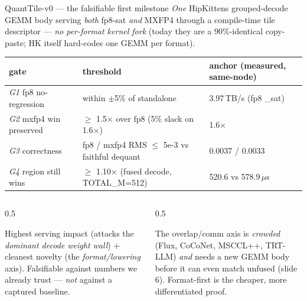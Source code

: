 \documentclass[pdf,aspectratio=169]{beamer}
\newcommand{\empy}[1]{{\color{darkorange}\emph{#1}}}
\newcommand{\empr}[1]{{\color{cardinalred}\emph{#1}}}
\newcommand{\examplebox}[2]{%
\begin{tcolorbox}[colframe=darkcardinal,colback=boxgray,title={#1}]
#2
\end{tcolorbox}}
\newcommand{\mc}[1]{{\ttfamily\small #1}}
\begin{document}
\begin{frame}{QuantTile-v0 --- the falsifiable first milestone}
\footnotesize
\empr{One} HipKittens grouped-decode GEMM body serving \empy{both} fp8-\mc{sat} \empy{and} MXFP4 through a compile-time tile descriptor --- \empr{no per-format kernel fork} (today they are a 90\%-identical copy-paste; HK itself hard-codes one GEMM per format).
\begin{center}
\scriptsize
\begin{tabular}{l l l}
\toprule
gate & threshold & anchor (measured, same-node) \\
\midrule
\empy{G1} fp8 no-regression & within $\pm$5\% of standalone & 3.97\,TB/s (fp8 \mc{\_sat}) \\
\empy{G2} mxfp4 win preserved & $\geq$ 1.5$\times$ over fp8 (5\% slack on 1.6$\times$) & 1.6$\times$ \\
\empy{G3} correctness & fp8 / mxfp4 RMS $\leq$ 5e-3 vs faithful dequant & 0.0037 / 0.0033 \\
\empy{G4} region still wins & $\geq$ 1.10$\times$ (fused decode, \mc{TOTAL\_M=512}) & 520.6 vs 578.9\,$\mu$s \\
\bottomrule
\end{tabular}
\end{center}
\begin{columns}
\begin{column}{0.5\textwidth}
\examplebox{Why this first}{\footnotesize
Highest serving impact (attacks the \empr{dominant decode weight wall}) $+$ cleanest novelty (the \empy{format/lowering} axis). Falsifiable against numbers we already trust --- \emph{not} against a captured baseline.}
\end{column}
\begin{column}{0.5\textwidth}
\examplebox{Why not comm first}{\footnotesize
The overlap/comm axis is \empr{crowded} (Flux, CoCoNet, MSCCL++, TRT-LLM) \emph{and} needs a new GEMM body before it can even match unfused (slide 6). Format-first is the cheaper, more differentiated proof.}
\end{column}
\end{columns}
\end{frame}
\end{document}
